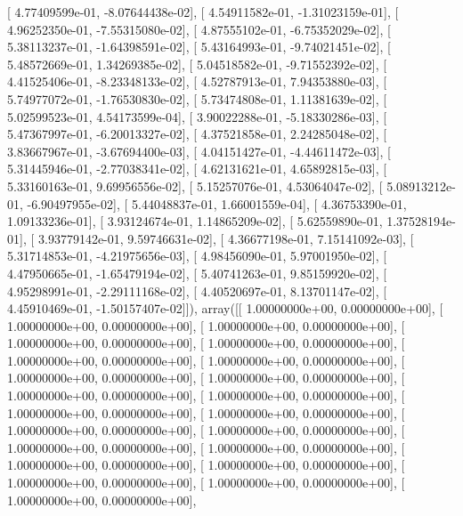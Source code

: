 \documentclass{article}
\begin{document}
       [  4.77409599e-01,  -8.07644438e-02],
       [  4.54911582e-01,  -1.31023159e-01],
       [  4.96252350e-01,  -7.55315080e-02],
       [  4.87555102e-01,  -6.75352029e-02],
       [  5.38113237e-01,  -1.64398591e-02],
       [  5.43164993e-01,  -9.74021451e-02],
       [  5.48572669e-01,   1.34269385e-02],
       [  5.04518582e-01,  -9.71552392e-02],
       [  4.41525406e-01,  -8.23348133e-02],
       [  4.52787913e-01,   7.94353880e-03],
       [  5.74977072e-01,  -1.76530830e-02],
       [  5.73474808e-01,   1.11381639e-02],
       [  5.02599523e-01,   4.54173599e-04],
       [  3.90022288e-01,  -5.18330286e-03],
       [  5.47367997e-01,  -6.20013327e-02],
       [  4.37521858e-01,   2.24285048e-02],
       [  3.83667967e-01,  -3.67694400e-03],
       [  4.04151427e-01,  -4.44611472e-03],
       [  5.31445946e-01,  -2.77038341e-02],
       [  4.62131621e-01,   4.65892815e-03],
       [  5.33160163e-01,   9.69956556e-02],
       [  5.15257076e-01,   4.53064047e-02],
       [  5.08913212e-01,  -6.90497955e-02],
       [  5.44048837e-01,   1.66001559e-04],
       [  4.36753390e-01,   1.09133236e-01],
       [  3.93124674e-01,   1.14865209e-02],
       [  5.62559890e-01,   1.37528194e-01],
       [  3.93779142e-01,   9.59746631e-02],
       [  4.36677198e-01,   7.15141092e-03],
       [  5.31714853e-01,  -4.21975656e-03],
       [  4.98456090e-01,   5.97001950e-02],
       [  4.47950665e-01,  -1.65479194e-02],
       [  5.40741263e-01,   9.85159920e-02],
       [  4.95298991e-01,  -2.29111168e-02],
       [  4.40520697e-01,   8.13701147e-02],
       [  4.45910469e-01,  -1.50157407e-02]]), array([[  1.00000000e+00,   0.00000000e+00],
       [  1.00000000e+00,   0.00000000e+00],
       [  1.00000000e+00,   0.00000000e+00],
       [  1.00000000e+00,   0.00000000e+00],
       [  1.00000000e+00,   0.00000000e+00],
       [  1.00000000e+00,   0.00000000e+00],
       [  1.00000000e+00,   0.00000000e+00],
       [  1.00000000e+00,   0.00000000e+00],
       [  1.00000000e+00,   0.00000000e+00],
       [  1.00000000e+00,   0.00000000e+00],
       [  1.00000000e+00,   0.00000000e+00],
       [  1.00000000e+00,   0.00000000e+00],
       [  1.00000000e+00,   0.00000000e+00],
       [  1.00000000e+00,   0.00000000e+00],
       [  1.00000000e+00,   0.00000000e+00],
       [  1.00000000e+00,   0.00000000e+00],
       [  1.00000000e+00,   0.00000000e+00],
       [  1.00000000e+00,   0.00000000e+00],
       [  1.00000000e+00,   0.00000000e+00],
       [  1.00000000e+00,   0.00000000e+00],
       [  1.00000000e+00,   0.00000000e+00],
       [  1.00000000e+00,   0.00000000e+00],
\end{document}
